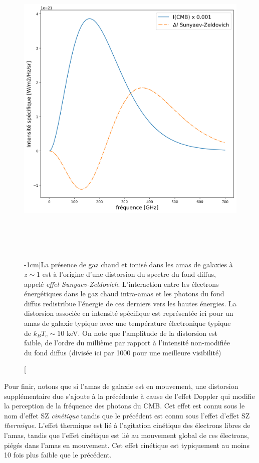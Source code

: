 \begin{figure}[htbp]
	\centering
		\includegraphics[height=15cm]{figs/SZ.png}
		\caption[L'effet SZ][-1cm]{La présence de gaz chaud et ionisé dans les amas de galaxies à $z\sim 1$ est à l'origine d'une distorsion du spectre du fond diffus, appelé \textit{effet Sunyaev-Zeldovich}. L'interaction entre les électrons énergétiques dans le gaz chaud intra-amas et les photons du fond diffus redistribue l'énergie de ces derniers vers les hautes énergies. La distorsion associée en intensité spécifique est représentée ici pour un amas de galaxie typique avec une température électronique typique de $k_B T_e \sim 10$ keV. On note que l'amplitude de la distorsion est faible, de l'ordre du millième par rapport à l'intensité non-modifiée du fond diffus (divisée ici par 1000 pour une meilleure visibilité) }
	\label{f:SZ}
\end{figure}
Pour finir, notons que si l'amas de galaxie est en mouvement, une distorsion supplémentaire due s'ajoute à la précédente à cause de l'effet Doppler qui modifie la perception de la fréquence des photons du CMB. Cet effet est connu sous le nom d'effet SZ \textit{cinétique} tandis que le précédent est connu sous l'effet d'effet SZ \textit{thermique}. L'effet thermique est lié à l'agitation cinétique des électrons libres de l'amas, tandis que l'effet cinétique est lié au mouvement global de ces électrons, piégés dans l'amas en mouvement. Cet effet cinétique est typiquement au moins 10 fois plus faible que le précédent.


